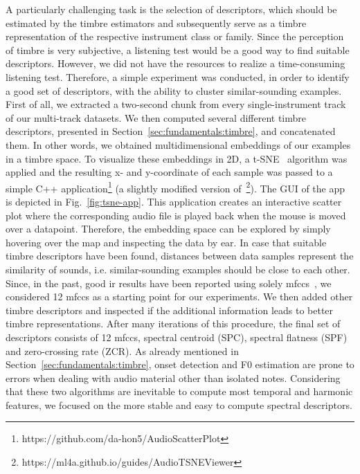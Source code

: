 A particularly challenging task is the selection of descriptors, which should be estimated by the timbre estimators and subsequently serve as a timbre representation of the respective instrument class or family. Since the perception of timbre is very subjective, a listening test would be a good way to find suitable descriptors. However, we did not have the resources to realize a time-consuming listening test. Therefore, a simple experiment was conducted, in order to identify a good set of descriptors, with the ability to cluster similar-sounding examples. First of all, we extracted a two-second chunk from every single-instrument track of our multi-track datasets. We then computed several different timbre descriptors, presented in Section~\ref{sec:fundamentals:timbre}, and concatenated them. In other words, we obtained multidimensional embeddings of our examples in a timbre space. To visualize these embeddings in 2D, a t-SNE~\cite{van2008tSNE} algorithm was applied and the resulting x- and y-coordinate of each sample was passed to a simple C++ application\footnote{https://github.com/da-hon5/AudioScatterPlot} (a slightly modified version of~\footnote{https://ml4a.github.io/guides/AudioTSNEViewer}). The GUI of the app is depicted in Fig.~\ref{fig:tsne-app}. This application creates an interactive scatter plot where the corresponding audio file is played back when the mouse is moved over a datapoint. Therefore, the embedding space can be explored by simply hovering over the map and inspecting the data by ear. In case that suitable timbre descriptors have been found, distances between data samples represent the similarity of sounds, i.e. similar-sounding examples should be close to each other. Since, in the past, good \gls{ir} results have been reported using solely \glspl{mfcc}~\cite{david2004efficient}, we considered 12 \glspl{mfcc} as a starting point for our experiments. We then added other timbre descriptors and inspected if the additional information leads to better timbre representations. After many iterations of this procedure, the final set of descriptors consists of 12 \glspl{mfcc}, spectral centroid (SPC), spectral flatness (SPF) and zero-crossing rate (ZCR). As already mentioned in Section~\ref{sec:fundamentals:timbre}, onset detection and F0 estimation are prone to errors when dealing with audio material other than isolated notes. Considering that these two algorithms are inevitable to compute most temporal and harmonic features, we focused on the more stable and easy to compute spectral descriptors.\\ 

